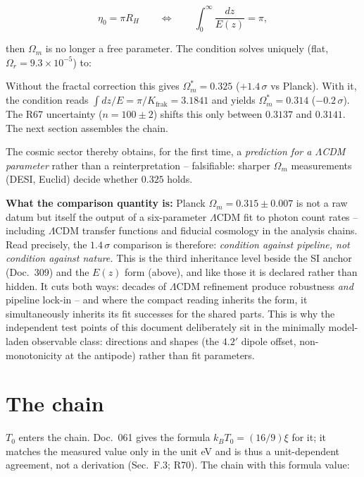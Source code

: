 \begin{equation}
  \eta_0 = \pi R_H
  \qquad\Longleftrightarrow\qquad
  \int_0^\infty \frac{dz}{E(z)} = \pi,
\end{equation}

then $\Omega_m$ is no longer a free parameter. The condition
solves uniquely (flat, $\Omega_r = 9.3\times10^{-5}$) to:

Without the fractal correction this gives
$\Omega_m^{*} = 0.325$ ($+1.4\,\sigma$ vs Planck). With it, the
condition reads $\int dz/E = \pi/K_\text{frak} = 3.1841$ and
yields $\Omega_m^{*} = 0.314$ ($-0.2\,\sigma$). The R67
uncertainty ($n = 100\pm2$) shifts this only between $0.3137$ and
$0.3141$. The next section assembles the chain.

The cosmic sector thereby obtains, for the first time, a
\emph{prediction for a $\Lambda$CDM parameter} rather than a
reinterpretation -- falsifiable: sharper $\Omega_m$ measurements
(DESI, Euclid) decide whether $0.325$ holds.

\textbf{What the comparison quantity is:} Planck
$\Omega_m = 0.315 \pm 0.007$ is not a raw datum but itself the
output of a six-parameter $\Lambda$CDM fit to photon count rates
-- including $\Lambda$CDM transfer functions and fiducial
cosmology in the analysis chains. Read precisely, the
$1.4\,\sigma$ comparison is therefore: \emph{condition against
pipeline, not condition against nature.} This is the third
inheritance level beside the SI anchor (Doc.~309) and the $E(z)$
form (above), and like those it is declared rather than hidden.
It cuts both ways: decades of $\Lambda$CDM refinement produce
robustness \emph{and} pipeline lock-in -- and where the compact
reading inherits the form, it simultaneously inherits its fit
successes for the shared parts. This is why the independent test
points of this document deliberately sit in the minimally
model-laden observable class: directions and shapes (the $4.2'$
dipole offset, non-monotonicity at the antipode) rather than fit
parameters.

\section{The chain}

$T_0$ enters the chain. Doc.~061 gives the formula
$k_BT_0 = (16/9)\xi$ for it; it matches the measured value only in
the unit eV and is thus a unit-dependent agreement, not a
derivation (Sec.~F.3; R70). The chain with this formula value:

